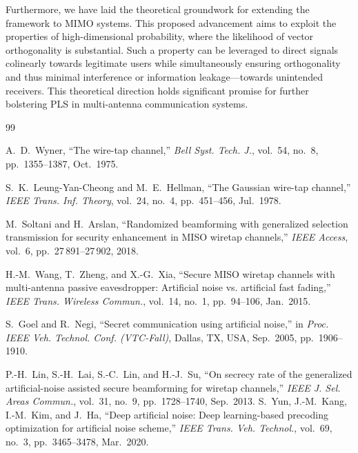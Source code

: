 \documentclass[10pt,a4paper]{article} %
\begin{document}
Furthermore, we have laid the theoretical groundwork for extending the framework to MIMO systems. This proposed advancement aims to exploit the properties of high-dimensional probability, where the likelihood of vector orthogonality is substantial. Such a property can be leveraged to direct signals colinearly towards legitimate users while simultaneously ensuring orthogonality and thus minimal interference or information leakage—towards unintended receivers. This theoretical direction holds significant promise for further bolstering PLS in multi-antenna communication systems.
\begin{thebibliography}{99}

A.~D.~Wyner, ``The wire-tap channel,'' \emph{Bell Syst. Tech. J.}, vol.~54, no.~8, pp.~1355–1387, Oct.~1975.

S.~K.~Leung-Yan-Cheong and M.~E.~Hellman, ``The Gaussian wire-tap channel,'' \emph{IEEE Trans. Inf. Theory}, vol.~24, no.~4, pp.~451–456, Jul.~1978.

M.~Soltani and H.~Arslan, ``Randomized beamforming with generalized selection transmission for security enhancement in MISO wiretap channels,'' \emph{IEEE Access}, vol.~6, pp.~27\,891–27\,902, 2018.



H.-M.~Wang, T.~Zheng, and X.-G.~Xia, ``Secure MISO wiretap channels with multi-antenna passive eavesdropper: Artificial noise vs. artificial fast fading,'' \emph{IEEE Trans. Wireless Commun.}, vol.~14, no.~1, pp.~94–106, Jan.~2015.

S.~Goel and R.~Negi, ``Secret communication using artificial noise,'' in \emph{Proc. IEEE Veh. Technol. Conf. (VTC-Fall)}, Dallas, TX, USA, Sep.~2005, pp.~1906–1910.

P.-H.~Lin, S.-H.~Lai, S.-C.~Lin, and H.-J.~Su, ``On secrecy rate of the generalized artificial-noise assisted secure beamforming for wiretap channels,'' \emph{IEEE J. Sel. Areas Commun.}, vol.~31, no.~9, pp.~1728–1740, Sep.~2013.
S.~Yun, J.-M.~Kang, I.-M.~Kim, and J.~Ha, ``Deep artificial noise: Deep learning-based precoding optimization for artificial noise scheme,'' \emph{IEEE Trans. Veh. Technol.}, vol.~69, no.~3, pp.~3465–3478, Mar.~2020.

\end{thebibliography}
\end{document}
